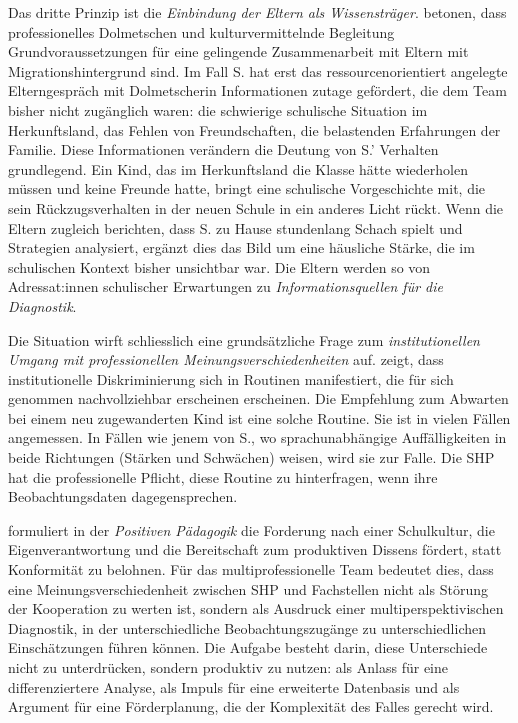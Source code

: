 \documentclass[ngerman, a4paper]{article}
\begin{document}
Das dritte Prinzip ist die \textit{Einbindung der Eltern als Wissensträger}.
\textcite[S.\,39]{kosoroklabhart2021voneltern} betonen, dass
professionelles Dolmetschen und kulturvermittelnde Begleitung
Grundvoraussetzungen für eine gelingende Zusammenarbeit mit Eltern mit
Migrationshintergrund sind. Im Fall S. hat erst das
ressourcenorientiert angelegte Elterngespräch mit Dolmetscherin Informationen
zutage gefördert, die dem Team bisher nicht zugänglich waren: die schwierige
schulische Situation im Herkunftsland, das Fehlen von Freundschaften, die
belastenden Erfahrungen der Familie. Diese Informationen verändern die
Deutung von S.' Verhalten grundlegend. Ein Kind, das im Herkunftsland die
Klasse hätte wiederholen müssen und keine Freunde hatte, bringt eine
schulische Vorgeschichte mit, die sein Rückzugsverhalten in der neuen Schule
in ein anderes Licht rückt. Wenn die Eltern zugleich berichten, dass S. zu
Hause stundenlang Schach spielt und Strategien analysiert, ergänzt dies das
Bild um eine häusliche Stärke, die im schulischen Kontext bisher unsichtbar
war. Die Eltern werden so von Adressat:innen schulischer Erwartungen zu
\textit{Informationsquellen für die Diagnostik}.

Die Situation wirft schliesslich eine grundsätzliche Frage zum
\textit{institutionellen Umgang mit professionellen Meinungsverschiedenheiten}
auf. \textcite[S.\,63--77]{kappus2010migration} zeigt, dass institutionelle Diskriminierung sich in Routinen
manifestiert, die für sich genommen nachvollziehbar erscheinen
erscheinen. Die Empfehlung zum Abwarten bei einem
neu zugewanderten Kind ist eine solche Routine. Sie ist in vielen Fällen
angemessen. In Fällen wie jenem von S., wo sprachunabhängige Auffälligkeiten
in beide Richtungen (Stärken und Schwächen) weisen, wird sie zur Falle.
Die SHP hat die professionelle Pflicht, diese Routine zu hinterfragen, wenn
ihre Beobachtungsdaten dagegensprechen.

\textcite{burow2021positive} formuliert in der \textit{Positiven Pädagogik} die Forderung nach
einer Schulkultur, die Eigenverantwortung und die Bereitschaft zum
produktiven Dissens fördert, statt Konformität zu belohnen.
Für das multiprofessionelle Team bedeutet dies, dass eine Meinungsverschiedenheit
zwischen SHP und Fachstellen nicht als Störung der Kooperation zu werten ist,
sondern als Ausdruck einer multiperspektivischen Diagnostik, in der
unterschiedliche Beobachtungszugänge zu unterschiedlichen Einschätzungen
führen können. Die Aufgabe besteht darin, diese Unterschiede nicht zu
unterdrücken, sondern produktiv zu nutzen: als Anlass für eine differenziertere
Analyse, als Impuls für eine erweiterte Datenbasis und als Argument für eine
Förderplanung, die der Komplexität des Falles gerecht wird.
\end{document}
